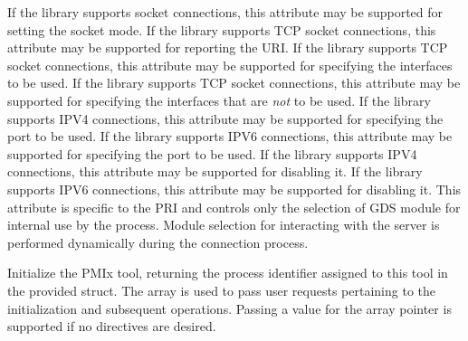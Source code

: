  If the library supports socket connections, this attribute may be supported for setting the socket mode.
\pasteAttributeItemEnd{}
 If the library supports TCP socket connections, this attribute may be supported for reporting the URI.
\pastePRIAttributeItemEnd{}
 If the library supports TCP socket connections, this attribute may be supported for specifying the interfaces to be used.
\pastePRIAttributeItemEnd{}
 If the library supports TCP socket connections, this attribute may be supported for specifying the interfaces that are \textit{not} to be used.
\pastePRIAttributeItemEnd{}
 If the library supports IPV4 connections, this attribute may be supported for specifying the port to be used.
\pastePRIAttributeItemEnd{}
 If the library supports IPV6 connections, this attribute may be supported for specifying the port to be used.
\pastePRIAttributeItemEnd{}
 If the library supports IPV4 connections, this attribute may be supported for disabling it.
\pastePRIAttributeItemEnd{}
 If the library supports IPV6 connections, this attribute may be supported for disabling it.
\pastePRIAttributeItemEnd{}
 This attribute is specific to the \ac{PRI} and controls only the selection of \ac{GDS} module for internal use by the process. Module selection for interacting with the server is performed dynamically during the connection process.
\pastePRIAttributeItemEnd{}

\optattrend

\descr

Initialize the \ac{PMIx} tool, returning the process identifier assigned to this tool in the provided  struct. The  array is used to pass user requests pertaining to the initialization and subsequent operations. Passing a  value for the array pointer is supported if no directives are desired.

